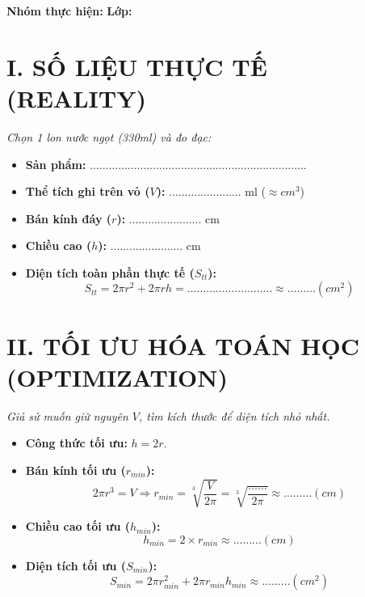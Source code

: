 \documentclass[12pt,a4paper]{article}
\begin{document}
\begin{center}
    \vspace{0.5cm}
\end{center}

\noindent \textbf{Nhóm thực hiện:} \dotfill \textbf{Lớp:} \dotfill

\section*{\color{ecogreen} I. SỐ LIỆU THỰC TẾ (REALITY)}
\textit{Chọn 1 lon nước ngọt (330ml) và đo đạc:}

\begin{itemize}
    \item \textbf{Sản phẩm:} .....................................................................
    \item \textbf{Thể tích ghi trên vỏ ($V$):} ....................... ml ($\approx cm^3$)
    \item \textbf{Bán kính đáy ($r$):} ....................... cm
    \item \textbf{Chiều cao ($h$):} ....................... cm
    \item \textbf{Diện tích toàn phần thực tế ($S_{tt}$):}
    $$ S_{tt} = 2\pi r^2 + 2\pi rh = \dots\dots\dots\dots\dots\dots\dots\dots\dots \approx \dots\dots\dots (cm^2) $$
\end{itemize}

\section*{\color{ecogreen} II. TỐI ƯU HÓA TOÁN HỌC (OPTIMIZATION)}
\textit{Giả sử muốn giữ nguyên $V$, tìm kích thước để diện tích nhỏ nhất.}

\begin{itemize}
    \item \textbf{Công thức tối ưu:} $h = 2r$.
    \item \textbf{Bán kính tối ưu ($r_{min}$):}
    $$ 2\pi r^3 = V \Rightarrow r_{min} = \sqrt[3]{\frac{V}{2\pi}} = \sqrt[3]{\frac{\dots\dots}{2\pi}} \approx \dots\dots\dots (cm) $$
    \item \textbf{Chiều cao tối ưu ($h_{min}$):}
    $$ h_{min} = 2 \times r_{min} \approx \dots\dots\dots (cm) $$
    \item \textbf{Diện tích tối ưu ($S_{min}$):}
    $$ S_{min} = 2\pi r_{min}^2 + 2\pi r_{min}h_{min} \approx \dots\dots\dots (cm^2) $$
\end{itemize}
\end{document}

